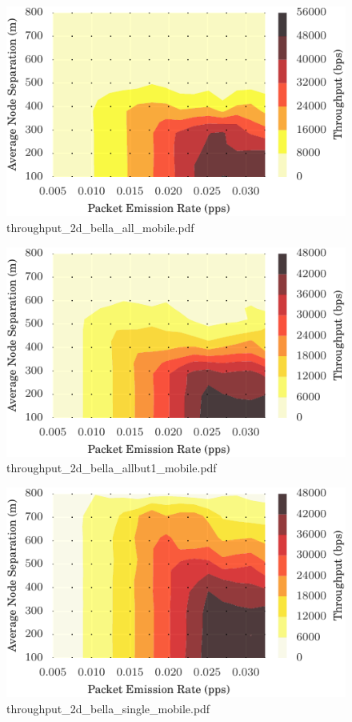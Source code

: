 \documentclass{article}
\begin{document}
\begin{figure}[h!]
\centering
\includegraphics[width=\linewidth]{throughput_2d_bella_all_mobile.pdf}
\caption{throughput\_2d\_bella\_all\_mobile.pdf}
\end{figure}




\begin{figure}[h!]
\centering
\includegraphics[width=\linewidth]{throughput_2d_bella_allbut1_mobile.pdf}
\caption{throughput\_2d\_bella\_allbut1\_mobile.pdf}
\end{figure}




\begin{figure}[h!]
\centering
\includegraphics[width=\linewidth]{throughput_2d_bella_single_mobile.pdf}
\caption{throughput\_2d\_bella\_single\_mobile.pdf}
\end{figure}
\end{document}

